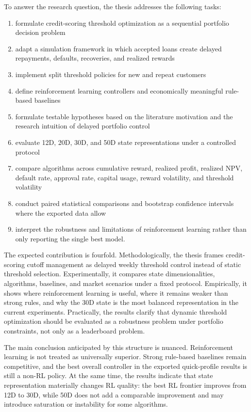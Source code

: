 \documentclass[12pt,a4paper]{article}
\begin{document}
To answer the research question, the thesis addresses the following tasks:
\begin{enumerate}[leftmargin=*]
    \item formulate credit-scoring threshold optimization as a sequential portfolio decision problem
    \item adapt a simulation framework in which accepted loans create delayed repayments, defaults, recoveries, and realized rewards
    \item implement split threshold policies for new and repeat customers
    \item define reinforcement learning controllers and economically meaningful rule-based baselines
    \item formulate testable hypotheses based on the literature motivation and the research intuition of delayed portfolio control
    \item evaluate 12D, 20D, 30D, and 50D state representations under a controlled protocol
    \item compare algorithms across cumulative reward, realized profit, realized NPV, default rate, approval rate, capital usage, reward volatility, and threshold volatility
    \item conduct paired statistical comparisons and bootstrap confidence intervals where the exported data allow
    \item interpret the robustness and limitations of reinforcement learning rather than only reporting the single best model.
\end{enumerate}

The expected contribution is fourfold. Methodologically, the thesis frames credit-scoring cutoff management as delayed weekly threshold control instead of static threshold selection. Experimentally, it compares state dimensionalities, algorithms, baselines, and market scenarios under a fixed protocol. Empirically, it shows where reinforcement learning is useful, where it remains weaker than strong rules, and why the 30D state is the most balanced representation in the current experiments. Practically, the results clarify that dynamic threshold optimization should be evaluated as a robustness problem under portfolio constraints, not only as a leaderboard problem.

The main conclusion anticipated by this structure is nuanced. Reinforcement learning is not treated as universally superior. Strong rule-based baselines remain competitive, and the best overall controller in the exported quick-profile results is still a non-RL policy. At the same time, the results indicate that state representation materially changes RL quality: the best RL frontier improves from 12D to 30D, while 50D does not add a comparable improvement and may introduce saturation or instability for some algorithms.
\end{document}
